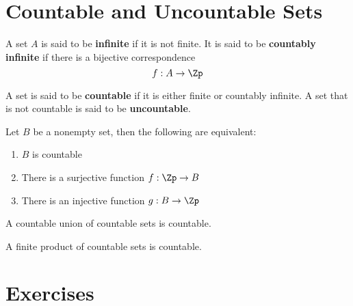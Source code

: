 \section{Countable and Uncountable Sets}

\begin{definition}
  A set $A$ is said to be \textbf{infinite} if it is not finite. It is said to
  be \textbf{countably infinite} if there is a bijective correspondence
  \begin{equation}
    f:A \to \Zp
  \end{equation}
\end{definition}

\begin{definition}
  A set is said to be \textbf{countable} if it is either finite or countably
  infinite. A set that is not countable is said to be \textbf{uncountable}.
\end{definition}

\begin{theorem}
  Let $B$ be a nonempty set, then the following are equivalent:
  \begin{enumerate}[label=(\arabic*)]
    \item $B$ is countable
    \item There is a surjective function $f : \Zp \to B$
    \item There is an injective function $g : B \to \Zp$
  \end{enumerate}
\end{theorem}

\begin{theorem}
  A countable union of countable sets is countable.
\end{theorem}

\begin{theorem}
  A finite product of countable sets is countable.
\end{theorem}

\section*{Exercises}


